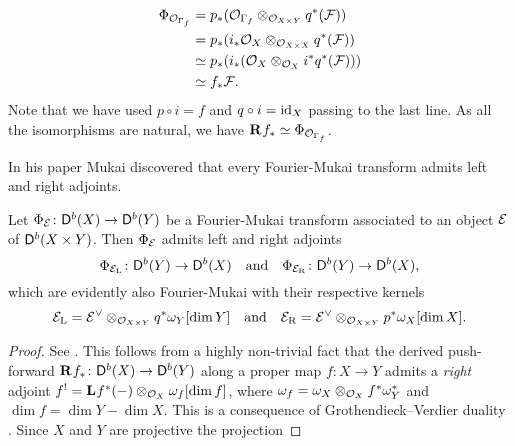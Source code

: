 \begin{example}
\begin{enumerate}[label = (\roman*)]
{\begin{align*}
        \Phi_{{\mathcal{O}_{\Gamma_f}}} &= p_*({\mathcal{O}_{\Gamma_f}} \otimes_{{\mathcal{O}_{X \times Y}}} q^*(\mathcal F)) \\
        &= p_*(i_*{\mathcal{O}_{X}} \otimes_{{\mathcal{O}_{X \times X}}} q^*(\mathcal F)) \\
        &\simeq p_*(i_*({\mathcal{O}_{X}} \otimes_{{\mathcal{O}_{X}}} i^*q^*(\mathcal F))) \\
        &\simeq f_*\mathcal F.
    \end{align*}
    Note that we have used $p \circ i = f$ and $q \circ i = \operatorname{id}_{X}$ passing to the last line. As all the isomorphisms are natural, we have $\mathbf{R}^{}f_* \simeq \Phi_{{\mathcal{O}_{\Gamma_f}}}$.
    }
\end{enumerate}
\end{example}

In his paper \cite{Mukai1981} Mukai discovered that every Fourier-Mukai transform admits left and right adjoints. 

\begin{proposition}[Mukai]
    \label{Adjoints of FM transforms}
    Let $\Phi_{\mathcal E} \colon \mathsf{D}^b(X) \to \mathsf{D}^b(Y)$ be a Fourier-Mukai transform associated to an object $\mathcal E$ of $\mathsf{D}^b(X \times Y)$. Then $\Phi_{\mathcal E}$ admits left and right adjoints
    \[
        \Phi_{\mathcal E_\mathrm{L}} \colon \mathsf{D}^b(Y) \to \mathsf{D}^b(X) \quad \text{and} \quad \Phi_{\mathcal E_\mathrm{R}} \colon \mathsf{D}^b(Y) \to \mathsf{D}^b(X),
    \]
    which are evidently also Fourier-Mukai with their respective kernels
    \[
        \mathcal E_\mathrm{L} = \mathcal E^\vee \otimes_{{\mathcal{O}_{X \times Y}}} q^*\omega_Y[\dim Y] \quad \text{and} \quad 
        \mathcal E_\mathrm{R} = \mathcal E^\vee \otimes_{{\mathcal{O}_{X \times Y}}} p^*\omega_X[\dim X].
    \]
\end{proposition}

\begin{proof}
    See \cite[\S 5, Proposition 5.9]{huybrechts2006fouriermukai}. This follows from a highly non-trivial fact that the derived push-forward $\mathbf{R}^{}f_* \colon \mathsf{D}^b(X) \to \mathsf{D}^b(Y)$ along a proper map $f \colon X \to Y$ admits a \emph{right} adjoint $f^! = \mathbf{L}^{}f^*(-) \otimes_{\mathcal{O}_{X}} \omega_f[\dim f]$, where $\omega_f = \omega_X \otimes_{\mathcal{O}_{X}} f^*\omega_Y^*$ and $\dim f = \dim Y - \dim X$. This is a consequence of Grothendieck--Verdier duality \cite[\S VII, Corollary 4.3]{Hartshorne1966}. Since $X$ and $Y$ are projective the projection   
\end{proof}

